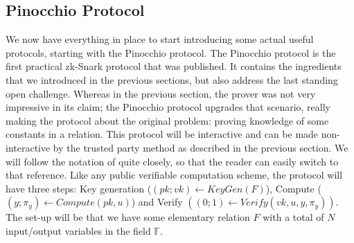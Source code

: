 \documentclass[11pt,oneside]{article}
\theoremstyle{definition}
\theoremstyle{remark}
\numberwithin{equation}{section}
\begin{document}
\subsection{Pinocchio Protocol}

We now have everything in place to start introducing some actual useful
protocols, starting with the Pinocchio
protocol\cite{parno2016pinocchio}. The Pinocchio protocol is the first
practical zk-Snark protocol that was published. It contains the
ingredients that we introduced in the previous sections, but also
address the last standing open challenge. Whereas in the previous
section, the prover was not very impressive in its claim; the Pinocchio
protocol upgrades that scenario, really making the protocol about the original
problem: proving knowledge of some constants in a relation. This protocol will
be interactive and can be made non-interactive by the trusted party method as
described in the previous section. We will follow the notation of
\cite{parno2016pinocchio} quite closely, so that the reader can easily switch to
that reference. Like any public verifiable computation scheme, the protocol will
have three steps: Key generation ($(pk;vk)\leftarrow KeyGen(F)$), Compute
($(y;\pi_y)\leftarrow Compute(pk,u)$) and Verify $((0;1)\leftarrow
Verify(vk,u,y,\pi_y))$.\\
The set-up will be that we have some elementary relation $F$ with a total of $N$
input/output variables in the field $\mathbb{F}$.
\end{document}
